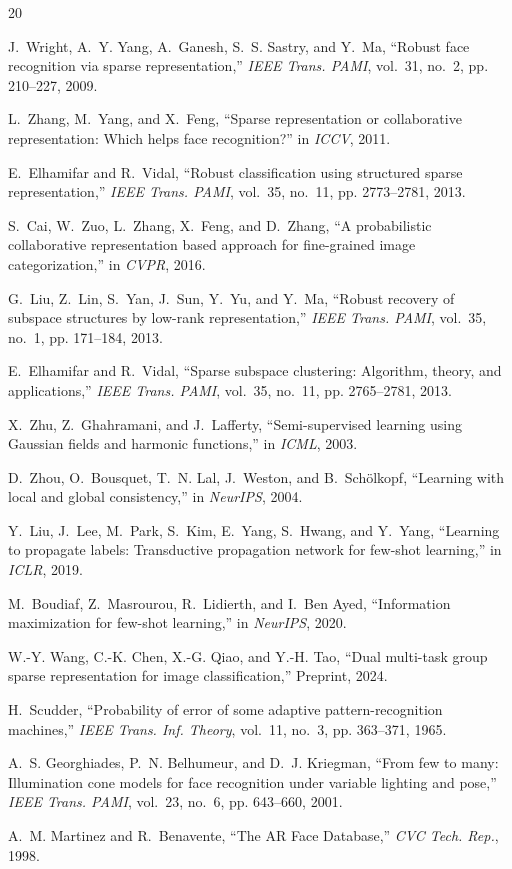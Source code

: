 \documentclass[10pt,comsoc]{IEEEtran}
\begin{document}

\begin{thebibliography}{20}

J.~Wright, A.~Y. Yang, A.~Ganesh, S.~S. Sastry, and Y.~Ma, ``Robust face recognition via sparse representation,'' \emph{IEEE Trans. PAMI}, vol.~31, no.~2, pp. 210--227, 2009.

L.~Zhang, M.~Yang, and X.~Feng, ``Sparse representation or collaborative representation: Which helps face recognition?'' in \emph{ICCV}, 2011.

E.~Elhamifar and R.~Vidal, ``Robust classification using structured sparse representation,'' \emph{IEEE Trans. PAMI}, vol.~35, no.~11, pp. 2773--2781, 2013.

S.~Cai, W.~Zuo, L.~Zhang, X.~Feng, and D.~Zhang, ``A probabilistic collaborative representation based approach for fine-grained image categorization,'' in \emph{CVPR}, 2016.

G.~Liu, Z.~Lin, S.~Yan, J.~Sun, Y.~Yu, and Y.~Ma, ``Robust recovery of subspace structures by low-rank representation,'' \emph{IEEE Trans. PAMI}, vol.~35, no.~1, pp. 171--184, 2013.

E.~Elhamifar and R.~Vidal, ``Sparse subspace clustering: Algorithm, theory, and applications,'' \emph{IEEE Trans. PAMI}, vol.~35, no.~11, pp. 2765--2781, 2013.

X.~Zhu, Z.~Ghahramani, and J.~Lafferty, ``Semi-supervised learning using Gaussian fields and harmonic functions,'' in \emph{ICML}, 2003.

D.~Zhou, O.~Bousquet, T.~N. Lal, J.~Weston, and B.~Sch{\"o}lkopf, ``Learning with local and global consistency,'' in \emph{NeurIPS}, 2004.

Y.~Liu, J.~Lee, M.~Park, S.~Kim, E.~Yang, S.~Hwang, and Y.~Yang, ``Learning to propagate labels: Transductive propagation network for few-shot learning,'' in \emph{ICLR}, 2019.

M.~Boudiaf, Z.~Masrourou, R.~Lidierth, and I.~Ben Ayed, ``Information maximization for few-shot learning,'' in \emph{NeurIPS}, 2020.

W.-Y. Wang, C.-K. Chen, X.-G. Qiao, and Y.-H. Tao, ``Dual multi-task group sparse representation for image classification,'' Preprint, 2024.

H.~Scudder, ``Probability of error of some adaptive pattern-recognition machines,'' \emph{IEEE Trans. Inf. Theory}, vol.~11, no.~3, pp. 363--371, 1965.

A.~S. Georghiades, P.~N. Belhumeur, and D.~J. Kriegman, ``From few to many: Illumination cone models for face recognition under variable lighting and pose,'' \emph{IEEE Trans. PAMI}, vol.~23, no.~6, pp. 643--660, 2001.

A.~M. Martinez and R.~Benavente, ``The AR Face Database,'' \emph{CVC Tech. Rep.}, 1998.

\end{thebibliography}
\end{document}
